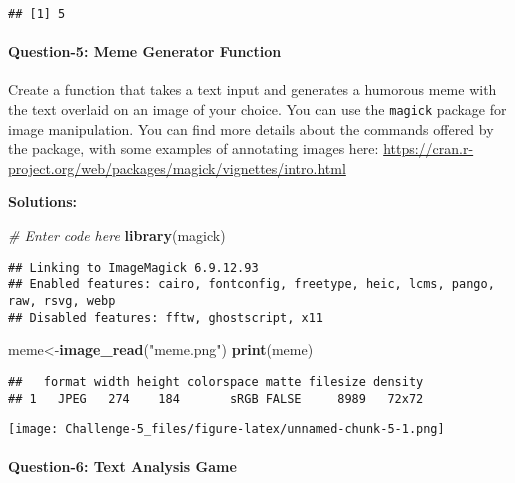 \documentclass[
]{article}
\newenvironment{Shaded}{\begin{snugshade}}{\end{snugshade}}
\newcommand{\CommentTok}[1]{\textcolor[rgb]{0.56,0.35,0.01}{\textit{#1}}}
\newcommand{\FunctionTok}[1]{\textcolor[rgb]{0.13,0.29,0.53}{\textbf{#1}}}
\newcommand{\NormalTok}[1]{#1}
\newcommand{\OtherTok}[1]{\textcolor[rgb]{0.56,0.35,0.01}{#1}}
\newcommand{\StringTok}[1]{\textcolor[rgb]{0.31,0.60,0.02}{#1}}
\begin{document}
\begin{verbatim}
## [1] 5
\end{verbatim}

\hypertarget{question-5-meme-generator-function}{%
\paragraph{Question-5: Meme Generator
Function}\label{question-5-meme-generator-function}}

Create a function that takes a text input and generates a humorous meme
with the text overlaid on an image of your choice. You can use the
\texttt{magick} package for image manipulation. You can find more
details about the commands offered by the package, with some examples of
annotating images here:
\url{https://cran.r-project.org/web/packages/magick/vignettes/intro.html}

\textbf{Solutions:}

\begin{Shaded}
\begin{Highlighting}[]
\CommentTok{\# Enter code here}
\FunctionTok{library}\NormalTok{(magick)}
\end{Highlighting}
\end{Shaded}

\begin{verbatim}
## Linking to ImageMagick 6.9.12.93
## Enabled features: cairo, fontconfig, freetype, heic, lcms, pango, raw, rsvg, webp
## Disabled features: fftw, ghostscript, x11
\end{verbatim}

\begin{Shaded}
\begin{Highlighting}[]
\NormalTok{meme}\OtherTok{\textless{}{-}}\FunctionTok{image\_read}\NormalTok{(}\StringTok{"meme.png"}\NormalTok{) }
\FunctionTok{print}\NormalTok{(meme) }
\end{Highlighting}
\end{Shaded}

\begin{verbatim}
##   format width height colorspace matte filesize density
## 1   JPEG   274    184       sRGB FALSE     8989   72x72
\end{verbatim}

\texttt{[image: Challenge-5\_files/figure-latex/unnamed-chunk-5-1.png]}

\hypertarget{question-6-text-analysis-game}{%
\paragraph{Question-6: Text Analysis
Game}\label{question-6-text-analysis-game}}
\end{document}
